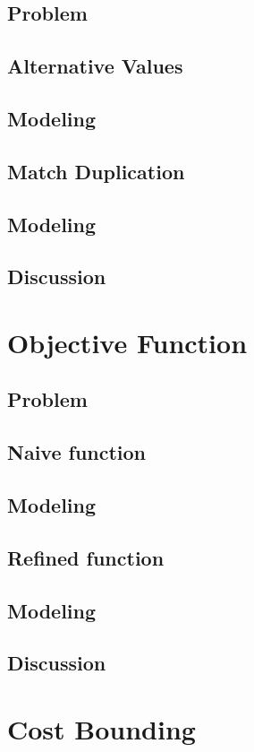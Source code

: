 \documentclass[twoside]{kthdiss}
\begin{document}
\section{Problem}
\section{Alternative Values}
\section{Modeling}
\section{Match Duplication}
\section{Modeling}
\section{Discussion}

\chapter{Objective Function}
\section{Problem}
\section{Naive function}
\section{Modeling}
\section{Refined function}
\section{Modeling}
\section{Discussion}

\chapter{Cost Bounding}
\end{document}
